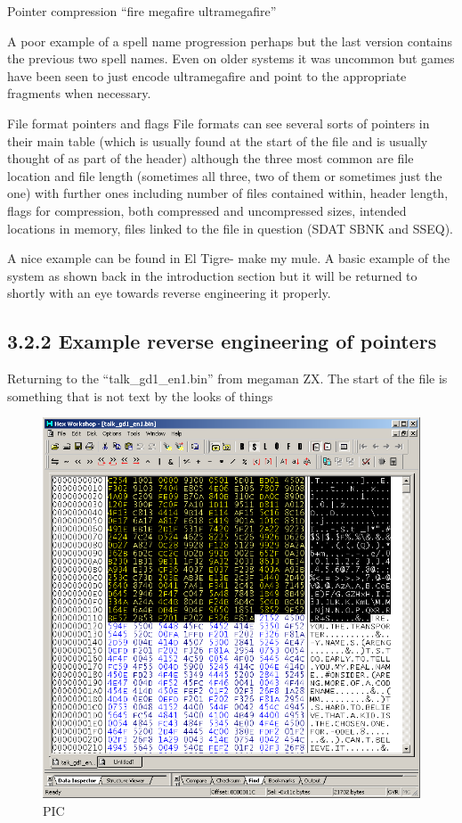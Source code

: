 \documentclass[
]{book}
\begin{document}
Pointer compression ``fire megafire ultramegafire''

A poor example of a spell name progression perhaps but the last version contains the previous two spell names. Even on older systems it was uncommon but games have been seen to just encode ultramegafire and point to the appropriate fragments when necessary.

File format pointers and flags File formats can see several sorts of pointers in their main table (which is usually found at the start of the file and is usually thought of as part of the header) although the three most common are file location and file length (sometimes all three, two of them or sometimes just the one) with further ones including number of files contained within, header length, flags for compression, both compressed and uncompressed sizes, intended locations in memory, files linked to the file in question (SDAT SBNK and SSEQ).

A nice example can be found in El Tigre- make my mule. A basic example of the system as shown back in the introduction section but it will be returned to shortly with an eye towards reverse engineering it properly.

\hypertarget{example-reverse-engineering-of-pointers}{%
\subsection{3.2.2 Example reverse engineering of pointers}\label{example-reverse-engineering-of-pointers}}

Returning to the ``talk\_gd1\_en1.bin'' from megaman ZX. The start of the file is something that is not text by the looks of things

\begin{figure}
\centering
\includegraphics{images/101_home_fast6191_romhackingguide_unrenamed_fil___borders_romhackingguidepointersexamplehexw1.png}
\caption{PIC}
\end{figure}
\end{document}
